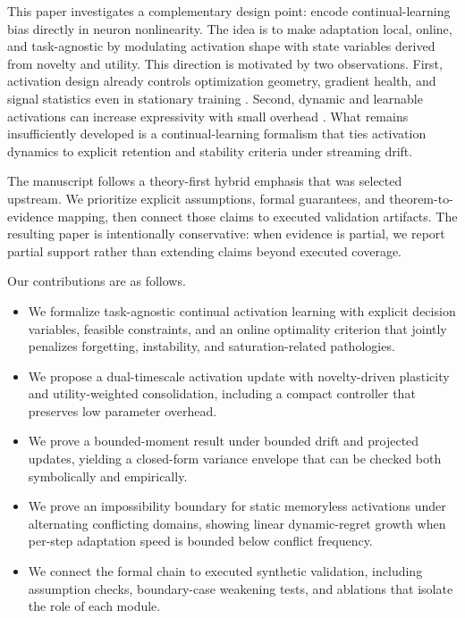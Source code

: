 \documentclass{article} %
\begin{document}
This paper investigates a complementary design point: encode continual-learning bias directly in neuron nonlinearity. The idea is to make adaptation local, online, and task-agnostic by modulating activation shape with state variables derived from novelty and utility. This direction is motivated by two observations. First, activation design already controls optimization geometry, gradient health, and signal statistics even in stationary training \citep{s21,s22,s23,s24,s25}. Second, dynamic and learnable activations can increase expressivity with small overhead \citep{s20,s26,s27}. What remains insufficiently developed is a continual-learning formalism that ties activation dynamics to explicit retention and stability criteria under streaming drift.

The manuscript follows a theory-first hybrid emphasis that was selected upstream. We prioritize explicit assumptions, formal guarantees, and theorem-to-evidence mapping, then connect those claims to executed validation artifacts. The resulting paper is intentionally conservative: when evidence is partial, we report partial support rather than extending claims beyond executed coverage.

Our contributions are as follows.
\begin{itemize}
\item We formalize task-agnostic continual activation learning with explicit decision variables, feasible constraints, and an online optimality criterion that jointly penalizes forgetting, instability, and saturation-related pathologies.
\item We propose a dual-timescale activation update with novelty-driven plasticity and utility-weighted consolidation, including a compact controller that preserves low parameter overhead.
\item We prove a bounded-moment result under bounded drift and projected updates, yielding a closed-form variance envelope that can be checked both symbolically and empirically.
\item We prove an impossibility boundary for static memoryless activations under alternating conflicting domains, showing linear dynamic-regret growth when per-step adaptation speed is bounded below conflict frequency.
\item We connect the formal chain to executed synthetic validation, including assumption checks, boundary-case weakening tests, and ablations that isolate the role of each module.
\end{itemize}
\end{document}
